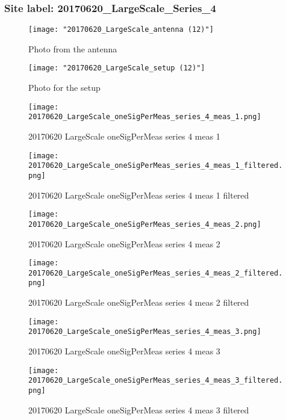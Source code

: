 \subsubsection{Site label: 20170620\_LargeScale\_Series\_4}
\begin{figure}[ht] \caption{Photo from the antenna}
\texttt{[image: "20170620\_LargeScale\_antenna (12)"]}\centering\end{figure}
\begin{figure}[ht] \caption{Photo for the setup}
\texttt{[image: "20170620\_LargeScale\_setup (12)"]}\centering\end{figure}
\begin{figure}[ht] \caption{20170620 LargeScale oneSigPerMeas series 4 meas 1}
\texttt{[image: 20170620\_LargeScale\_oneSigPerMeas\_series\_4\_meas\_1.png]}\centering\end{figure}
\begin{figure}[ht] \caption{20170620 LargeScale oneSigPerMeas series 4 meas 1 filtered}
\texttt{[image: 20170620\_LargeScale\_oneSigPerMeas\_series\_4\_meas\_1\_filtered.png]}\centering\end{figure}
\begin{figure}[ht] \caption{20170620 LargeScale oneSigPerMeas series 4 meas 2}
\texttt{[image: 20170620\_LargeScale\_oneSigPerMeas\_series\_4\_meas\_2.png]}\centering\end{figure}
\begin{figure}[ht] \caption{20170620 LargeScale oneSigPerMeas series 4 meas 2 filtered}
\texttt{[image: 20170620\_LargeScale\_oneSigPerMeas\_series\_4\_meas\_2\_filtered.png]}\centering\end{figure}
\begin{figure}[ht] \caption{20170620 LargeScale oneSigPerMeas series 4 meas 3}
\texttt{[image: 20170620\_LargeScale\_oneSigPerMeas\_series\_4\_meas\_3.png]}\centering\end{figure}
\begin{figure}[ht] \caption{20170620 LargeScale oneSigPerMeas series 4 meas 3 filtered}
\texttt{[image: 20170620\_LargeScale\_oneSigPerMeas\_series\_4\_meas\_3\_filtered.png]}\centering\end{figure}
\clearpage
